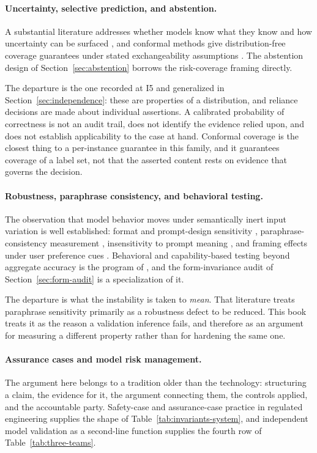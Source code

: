 \paragraph{Uncertainty, selective prediction, and abstention.} A substantial
literature addresses whether models know what they know and how uncertainty can be
surfaced \citep{kadavath2022,lin2022}, and conformal methods give distribution-free
coverage guarantees under stated exchangeability assumptions
\citep{angelopoulos2023}. The abstention design of Section~\ref{sec:abstention}
borrows the risk-coverage framing directly.

The departure is the one recorded at I5 and generalized in
Section~\ref{sec:independence}: these are properties of a distribution, and reliance
decisions are made about individual assertions. A calibrated probability of
correctness is not an audit trail, does not identify the evidence relied upon, and
does not establish applicability to the case at hand. Conformal coverage is the
closest thing to a per-instance guarantee in this family, and it guarantees coverage
of a label set, not that the asserted content rests on evidence that governs the
decision.

\paragraph{Robustness, paraphrase consistency, and behavioral testing.} The
observation that model behavior moves under semantically inert input variation is
well established: format and prompt-design sensitivity \citep{sclar2024},
paraphrase-consistency measurement \citep{elazar2021}, insensitivity to prompt meaning
\citep{webson2022}, and framing effects under user preference cues
\citep{sharma2024}. Behavioral and capability-based testing beyond aggregate accuracy
is the program of \citet{ribeiro2020}, and the form-invariance audit of
Section~\ref{sec:form-audit} is a specialization of it.

The departure is what the instability is taken to \emph{mean}. That literature treats
paraphrase sensitivity primarily as a robustness defect to be reduced. This book
treats it as the reason a validation inference fails, and therefore as an argument for
measuring a different property rather than for hardening the same one.

\paragraph{Assurance cases and model risk management.} The argument here belongs to a
tradition older than the technology: structuring a claim, the evidence for it, the
argument connecting them, the controls applied, and the accountable party.
Safety-case and assurance-case practice in regulated engineering supplies the shape of
Table~\ref{tab:invariants-system}, and independent model validation as a second-line
function supplies the fourth row of Table~\ref{tab:three-teams}.

